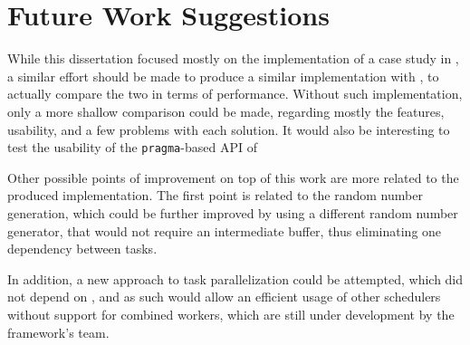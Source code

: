 \documentclass[main.tex]{subfiles}
\begin{document}
\chapter{Future Work Suggestions} \label{chapter:future}

While this dissertation focused mostly on the implementation of a case study in \starpu, a similar effort should be made to produce a similar implementation with \gama, to actually compare the two in terms of performance. Without such implementation, only a more shallow comparison could be made, regarding mostly the features, usability, and a few problems with each solution.
It would also be interesting to test the usability of the \texttt{pragma}-based API of \starpu

Other possible points of improvement on top of this work are more related to the produced implementation. The first point is related to the random number generation, which could be further improved by using a different random number generator, that would not require an intermediate buffer, thus eliminating one dependency between tasks.

In addition, a new approach to task parallelization could be attempted, which did not depend on \openmp, and as such would allow an efficient usage of other \starpu schedulers without support for combined workers, which are still under development by the framework's team.
\end{document}
